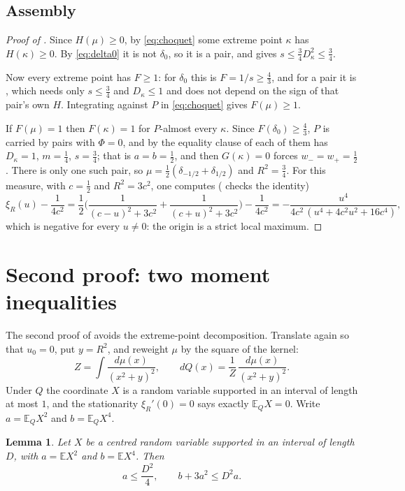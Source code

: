 \documentclass[11pt]{amsart}
\newtheorem{lemma}[theorem]{Lemma}
\theoremstyle{definition}
\newcommand{\E}{\mathbb{E}}
\begin{document}
\subsection{Assembly}

\begin{proof}[Proof of ]
Since $H(\mu)\ge0$, by \eqref{eq:choquet} some extreme point $\kappa$ has $H(\kappa)\ge0$. By \eqref{eq:delta0} it is not $\delta_0$, so it is a pair, and  gives $s\le\frac34D_\kappa^2\le\frac34$.

Now every extreme point has $F\ge1$: for $\delta_0$ this is $F=1/s\ge\frac43$, and for a pair it is , which needs only $s\le\frac34$ and $D_\kappa\le1$ and does not depend on the sign of that pair's own $H$. Integrating against $P$ in \eqref{eq:choquet} gives $F(\mu)\ge1$.

If $F(\mu)=1$ then $F(\kappa)=1$ for $P$-almost every $\kappa$. Since $F(\delta_0)\ge\frac43$, $P$ is carried by pairs with $\Phi=0$, and by the equality clause of  each of them has $D_\kappa=1$, $m=\frac14$, $s=\frac34$; that is $a=b=\frac12$, and then $G(\kappa)=0$ forces $w_-=w_+=\frac12$. There is only one such pair, so $\mu=\frac12(\delta_{-1/2}+\delta_{1/2})$ and $R^2=\frac34$. For this measure, with $c=\frac12$ and $R^2=3c^2$, one computes ( checks the identity)
\begin{equation}\label{eq:bernoulli-profile}
\xi_R(u)-\frac1{4c^2}=\frac12\Big(\frac1{(c-u)^2+3c^2}+\frac1{(c+u)^2+3c^2}\Big)-\frac1{4c^2}
=-\frac{u^4}{4c^2\,(u^4+4c^2u^2+16c^4)},
\end{equation}
which is negative for every $u\ne0$: the origin is a strict local maximum.
\end{proof}

\section{Second proof: two moment inequalities}\label{sec:moments}

The second proof of  avoids the extreme-point decomposition. Translate again so that $u_0=0$, put $y=R^2$, and reweight $\mu$ by the square of the kernel:
\[
Z=\int\frac{d\mu(x)}{(x^2+y)^2},\qquad dQ(x)=\frac{1}{Z}\,\frac{d\mu(x)}{(x^2+y)^2}.
\]
Under $Q$ the coordinate $X$ is a random variable supported in an interval of length at most $1$, and the stationarity $\xi_R'(0)=0$ says exactly $\E_Q X=0$. Write $a=\E_QX^2$ and $b=\E_QX^4$.

\begin{lemma}\label{lem:moments}
Let $X$ be a centred random variable supported in an interval of length $D$, with $a=\E X^2$ and $b=\E X^4$. Then
\[
a\le\frac{D^2}4,\qquad b+3a^2\le D^2a .
\]
\end{lemma}
\end{document}

